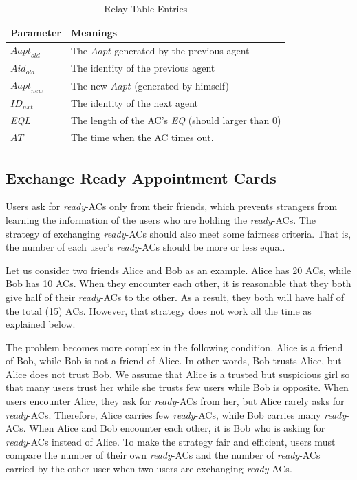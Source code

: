 \begin{table} [hbtp]
\caption{Relay Table Entries}
\label{table:RelayTableEntries}
\centering
\tabulinesep=2mm
\begin{tabu} to 110 mm {|X[1,c]|X[4,l]|} \hline 
Parameter & Meanings \\ \hline 
${Aapt}_{old}$ & The $Aapt$ generated by the previous agent \\ \hline 
${Aid}_{old}$ & The identity of the previous agent \\ \hline 
${Aapt}_{new}$ & The new $Aapt$ (generated by himself) \\ \hline 
${ID}_{nxt}$ & The identity of the next agent \\ \hline 
\textit{EQL} & The length of the AC's \textit{EQ} (should larger than 0) \\ \hline 
$AT$ & The time when the AC times out. \\ \hline 
\end{tabu}
\end{table}

\subsection{ Exchange Ready Appointment Cards}

\noindent Users ask for \textit{ready}-ACs only from their friends, which prevents strangers from learning the information of the users who are holding the \textit{ready}-ACs. The strategy of exchanging \textit{ready}-ACs should also meet some fairness criteria. That is, the number of each user's \textit{ready}-ACs should be more or less equal. 

Let us consider two friends Alice and Bob as an example. Alice has 20 ACs, while Bob has 10 ACs. When they encounter each other, it is reasonable that they both give half of their \textit{ready}-ACs to the other. As a result, they both will have half of the total (15) ACs. However, that strategy does not work all the time as explained below.

The problem becomes more complex in the following condition. Alice is a friend of Bob, while Bob is not a friend of Alice. In other words, Bob trusts Alice, but Alice does not trust Bob. We assume that Alice is a trusted but suspicious girl so that many users trust her while she trusts few users while Bob is opposite. When users encounter Alice, they ask for \textit{ready}-ACs from her, but Alice rarely asks for \textit{ready}-ACs. Therefore, Alice carries few \textit{ready}-ACs, while Bob carries many \textit{ready}-ACs. When Alice and Bob encounter each other, it is Bob who is asking for \textit{ready}-ACs instead of Alice. To make the strategy fair and efficient, users must compare the number of their own \textit{ready}-ACs and the number of \textit{ready}-ACs carried by the other user when two users are exchanging \textit{ready}-ACs.

